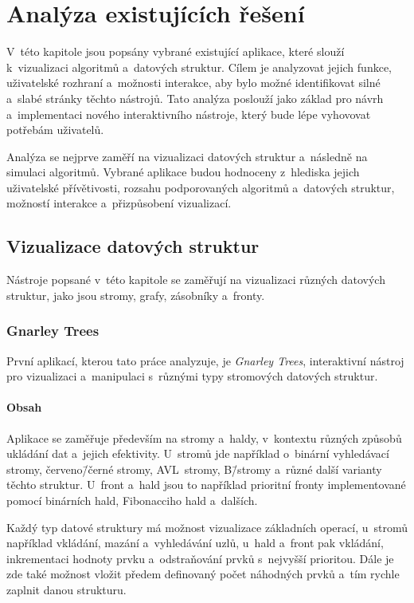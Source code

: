 \chapter{Analýza existujících řešení}
\label{chap:other_apps}

V~této kapitole jsou popsány vybrané existující aplikace, které slouží k~vizualizaci algoritmů a~datových struktur.
Cílem je analyzovat jejich funkce, uživatelské rozhraní a~možnosti interakce, aby bylo možné identifikovat silné a~slabé stránky těchto nástrojů.
Tato analýza poslouží jako základ pro návrh a~implementaci nového interaktivního nástroje, který bude lépe vyhovovat potřebám uživatelů.

Analýza se nejprve zaměří na vizualizaci datových struktur a~následně na simulaci algoritmů.
Vybrané aplikace budou hodnoceny z~hlediska jejich uživatelské přívětivosti, rozsahu podporovaných algoritmů a~datových struktur, možností interakce a~přizpůsobení vizualizací.

\section{Vizualizace datových struktur}
\label{sec:other_apps_data_structures}

Nástroje popsané v~této kapitole se zaměřují na vizualizaci různých datových struktur, jako jsou stromy, grafy, zásobníky a~fronty.

\subsection{Gnarley Trees}
\label{subsec:other_apps_ds_gnarley_trees}

První aplikací, kterou tato práce analyzuje, je \textit{Gnarley Trees}, interaktivní nástroj pro vizualizaci a~manipulaci s~různými typy stromových datových struktur.~\cite{gnarleyTrees}

\subsubsection*{Obsah}

Aplikace se zaměřuje především na stromy a~haldy, v~kontextu různých způsobů ukládání dat a~jejich efektivity.
U~stromů jde například o~binární vyhledávací stromy, červeno\=/černé stromy, AVL~stromy, B\=/stromy a~různé další varianty těchto struktur.
U~front a~hald jsou to například prioritní fronty implementované pomocí binárních hald, Fibonacciho hald a~dalších.

Každý typ datové struktury má možnost vizualizace základních operací, u~stromů například vkládání, mazání a~vyhledávání uzlů, u~hald a~front pak vkládání, inkrementaci hodnoty prvku a~odstraňování prvků s~nejvyšší prioritou.
Dále je zde také možnost vložit předem definovaný počet náhodných prvků a~tím rychle zaplnit danou strukturu.

